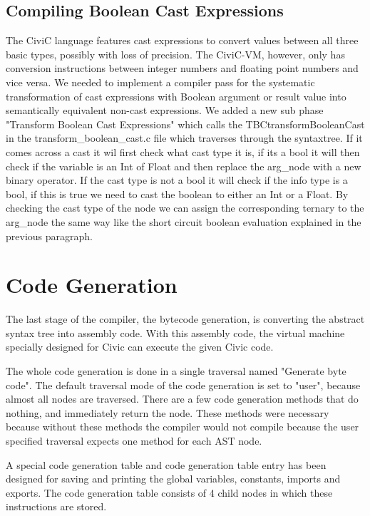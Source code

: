 \documentclass[hidelinks]{uva-inf-article}
\begin{document}
\subsection{Compiling Boolean Cast Expressions}
The CiviC language features cast expressions to convert values between all three basic types, possibly 
with loss of precision. The CiviC-VM, however, only has conversion instructions between integer numbers 
and floating point numbers and vice versa. We needed to implement a compiler pass for the systematic 
transformation of cast expressions with Boolean argument or result value into semantically equivalent 
non-cast expressions. We added a new sub phase "Transform Boolean Cast Expressions" which calls the 
TBCtransformBooleanCast in the transform\_boolean\_cast.c file which traverses through the syntaxtree.
If it comes across a cast it wil first check what cast type it is, if its a bool it will then check if the
variable is an Int of Float and then replace the arg\_node with a new binary operator. If the cast type
is not a bool it will check if the info type is a bool, if this is true we need to cast the boolean to 
either an Int or a Float. By checking the cast type of the node we can assign the corresponding ternary
to the arg\_node the same way like the short circuit boolean evaluation explained in the previous paragraph.

\newpage
\section{Code Generation}
\par The last stage of the compiler, the bytecode generation, is converting the abstract syntax tree into assembly code. 
With this assembly code, the virtual machine specially designed for Civic can execute the given Civic code.

\par The whole code generation is done in a single traversal named "Generate byte code".
The default traversal mode of the code generation is set to "user", because almost all nodes are traversed.
There are a few code generation methods that do nothing, and immediately return the node. 
These methods were necessary because without these methods the compiler would not compile because the user specified traversal expects one method for each AST node.

\par A special code generation table and code generation table entry has been designed for saving and printing the global variables, constants, imports and exports. 
The code generation table consists of 4 child nodes in which these instructions are stored.
\end{document}
